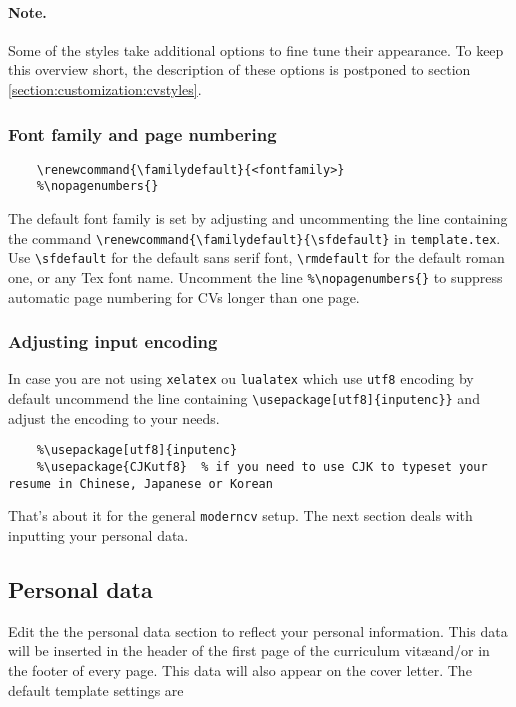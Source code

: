 \documentclass[a4paper,11pt]{article}
\newcommand{\code}[1]{\lstinline!#1!}
\newcommand{\Code}[1]{\lstinline!#1! } %
\newcommand{\Moderncv}{\Code{moderncv}}
\newcommand{\cvtemplate}{\code{template.tex}}
\begin{document}
\paragraph{Note.} Some of the styles take additional options to fine tune their appearance. To keep 
this overview short, the description of these options is postponed to section \ref{section:customization:cvstyles}.

\subsubsection*{Font family and page numbering}
\begin{lstlisting}
    \renewcommand{\familydefault}{<fontfamily>}
    %\nopagenumbers{}
\end{lstlisting}
The default font family is set by adjusting and uncommenting the line containing the command 
\lstinline!\renewcommand{\familydefault}{\sfdefault}! in \cvtemplate.
Use \lstinline!\sfdefault! for the default sans serif font, \lstinline!\rmdefault! for the default roman one, or any Tex font name.
 Uncomment the line \lstinline!%\nopagenumbers{}! to suppress automatic page numbering for CVs longer than one page.

\subsubsection*{Adjusting input encoding}
In case you are not using \Code{xelatex} ou \Code{lualatex} which use \Code{utf8} encoding by default uncommend the line containing \lstinline!\usepackage[utf8]{inputenc}}! and adjust the encoding to your needs. 
\begin{lstlisting}
    %\usepackage[utf8]{inputenc}
    %\usepackage{CJKutf8}  % if you need to use CJK to typeset your resume in Chinese, Japanese or Korean
\end{lstlisting}
That's about it for the general \Moderncv setup. 
The next section deals with inputting your personal data.

\subsection{Personal data}
Edit the the personal data section to reflect your personal information. This data will be inserted in the header of the first page of the curriculum vit\ae and/or in the footer of every page. 
This data will also appear on the cover letter. 
The default template settings are
\end{document}
